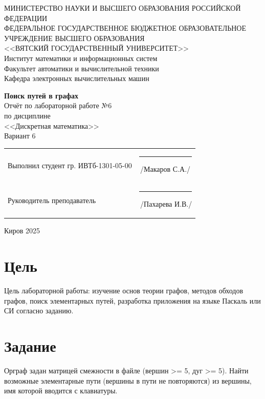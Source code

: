 \documentclass[a4paper,14pt]{extarticle}
\begin{document}
  \newpage\thispagestyle{empty}
  \begin{center}
    \MakeUppercase{
      Министерство науки и высшего образования Российской Федерации\\
      Федеральное государственное бюджетное образовательное учреждение высшего образования\\
      <<Вятский Государственный Университет>>\\
    }
    Институт математики и информационных систем\\
    Факультет автоматики и вычислительной техники\\
    Кафедра электронных вычислительных машин
  \end{center}
  \vfill

  \begin{center}
    \textbf{Поиск путей в графах}\\
    Отчёт по лабораторной работе №6\\
    по дисциплине\\
    <<Дискретная математика>>\\
    Вариант 6
  \end{center}
  \vfill

  \noindent
  \begin{tabular}{ll}
    Выполнил студент гр. ИВТб-1301-05-00 \hspace{5mm} &
    \rule[-1mm]{25mm}{0.10mm}\,/Макаров С.А./\\
    
    Руководитель преподаватель & \rule[-1mm]{25mm}{0.10mm}\,/Пахарева И.В./\\
  \end{tabular}

  \vfill
  \begin{center}
    Киров 2025
  \end{center}

  \newpage
  \section*{\hspace{12.5mm}Цель}
  Цель лабораторной работы: изучение основ теории графов, методов обходов графов, поиск элементарных путей, разработка приложения на языке Паскаль или СИ согласно заданию.

  \section*{\hspace{12.5mm}Задание}
  Орграф задан матрицей смежности в файле (вершин >= 5, дуг >= 5). Найти возможные элементарные пути (вершины в пути не повторяются) из вершины, имя которой вводится с клавиатуры.
\end{document}
